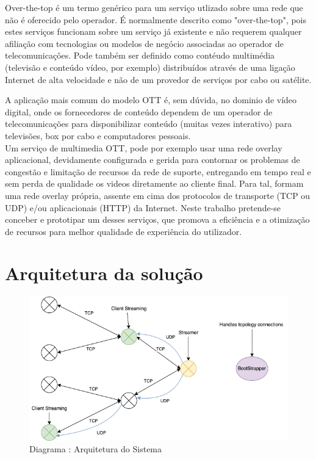 \documentclass[a4paper, 11pt]{article}
\begin{document}
Over-the-top é um termo genérico para um serviço utlizado sobre uma rede que não é oferecido pelo operador. É normalmente descrito como "over-the-top", pois estes serviços funcionam sobre um serviço já existente e não requerem qualquer afiliação com tecnologias ou modelos de negócio associadas ao operador de telecomunicaçôes. Pode também ser definido como contéudo multimédia (televisão e conteúdo vídeo, por exemplo) distribuídos através de uma ligação Internet
de alta velocidade e não de um provedor de serviços por cabo ou satélite. 

A aplicação mais comum do modelo OTT é, sem dúvida, no dominio de vídeo digital, onde os fornecedores de conteúdo dependem de um operador de telecomunicações para disponibilizar conteúdo (muitas vezes interativo) para televisões, box por cabo e computadores pessoais. \cite{ott}\\

Um serviço de multimedia OTT, pode por exemplo usar uma rede overlay aplicacional, devidamente configurada e gerida para contornar os problemas de congestão e limitação de recursos da rede de suporte, entregando em tempo real e sem perda de qualidade os videos diretamente ao cliente final.
Para tal, formam uma rede overlay própria, assente em cima dos protocolos de transporte (TCP ou UDP) e/ou aplicacionais (HTTP) da Internet. Neste trabalho pretende-se conceber e prototipar um desses serviços, que promova a eficiência e a otimização de recursos para melhor qualidade de experiência do utilizador. 




\section{Arquitetura da solução}

\begin{figure}[h]
    \centering
    \includegraphics[height=0.5\textwidth, width=0.9\linewidth]{images/redesnacho.png}
    \caption {Diagrama : Arquitetura do Sistema}
\end{figure} 
\end{document}

